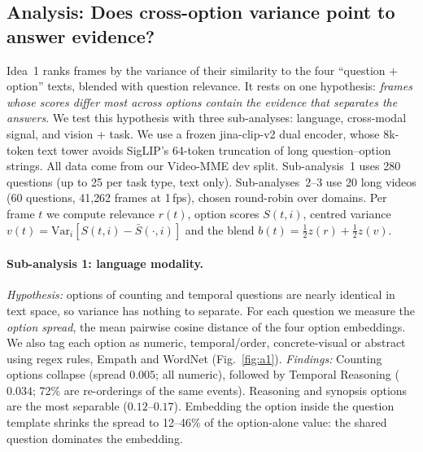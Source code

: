 
\subsection{Analysis: Does cross-option variance point to answer evidence?}
\label{sec:a-contrastive}

Idea~1 ranks frames by the variance of their similarity to the four ``question + option''
texts, blended with question relevance. It rests on one hypothesis: \emph{frames whose scores differ most
across options contain the evidence that separates the answers}. We test this hypothesis with
three sub-analyses: language, cross-modal signal, and vision + task. We use a frozen
jina-clip-v2 dual encoder, whose 8k-token text tower avoids SigLIP's 64-token truncation of
long question--option strings. All data come from our Video-MME dev split.
Sub-analysis~1 uses 280 questions (up to 25 per task type, text only).
Sub-analyses~2--3 use 20 long videos (60 questions, 41{,}262 frames at 1\,fps), chosen
round-robin over domains. Per frame $t$ we compute relevance $r(t)$, option scores $S(t,i)$,
centred variance $v(t)=\mathrm{Var}_i[S(t,i)-\bar S(\cdot,i)]$ and the blend
$b(t)=\tfrac12 z(r)+\tfrac12 z(v)$.

\paragraph{Sub-analysis 1: language modality.}
\emph{Hypothesis:} options of counting and temporal questions are nearly identical in text
space, so variance has nothing to separate. For each question we measure the \emph{option
spread}, the mean pairwise cosine distance of the four option embeddings. We also tag each option as
numeric, temporal/order, concrete-visual or abstract using regex rules, Empath and
WordNet (Fig.~\ref{fig:a1}).
\emph{Findings:} Counting options collapse (spread $0.005$; all numeric), followed by
Temporal Reasoning ($0.034$; 72\% are re-orderings of the same events). Reasoning and synopsis
options are the most separable ($0.12$--$0.17$). Embedding the option inside the
question template shrinks the spread to 12--46\% of the option-alone value: the shared
question dominates the embedding.

